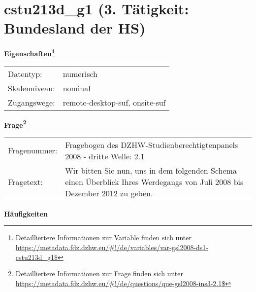 
    \setcounter{footnote}{0}

    \vspace*{-1.8cm}
	\section{cstu213d\_g1 (3. Tätigkeit: Bundesland der HS)}
	\label{section:cstu213d_g1}



    \vspace*{0.5cm}
    \noindent\textbf{Eigenschaften\footnote{Detailliertere Informationen zur Variable finden sich unter
		\url{https://metadata.fdz.dzhw.eu/\#!/de/variables/var-gsl2008-ds1-cstu213d_g1$}}}\\
	\begin{tabularx}{\hsize}{@{}lX}
	Datentyp: & numerisch \\
	Skalenniveau: & nominal \\
	Zugangswege: &
	  remote-desktop-suf, 
	  onsite-suf
 \\
    \end{tabularx}



				\vspace*{0.5cm}
                \noindent\textbf{Frage\footnote{Detailliertere Informationen zur Frage finden sich unter
		              \url{https://metadata.fdz.dzhw.eu/\#!/de/questions/que-gsl2008-ins3-2.1$}}}\\
				\begin{tabularx}{\hsize}{@{}lX}
					Fragenummer: &
					  Fragebogen des DZHW-Studienberechtigtenpanels 2008 - dritte Welle:
					  2.1
 \\
					Fragetext: & Wir bitten Sie nun, uns in dem folgenden Schema einen Überblick Ihres Werdegangs von Juli 2008 bis Dezember 2012 zu geben. \\
				\end{tabularx}





        		\vspace*{0.5cm}
                \noindent\textbf{Häufigkeiten}

